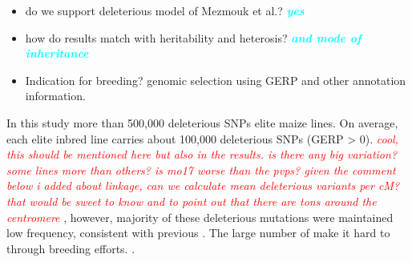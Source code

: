 \documentclass[9pt,twocolumn,twoside]{gsajnl}
\newcommand{\yang}[1]{\textcolor{cyan}{\emph{\bf  #1}} }
\newcommand{\jri}[1]{\textcolor{red}{ \emph{ #1}} }
\begin{document}
\begin{itemize}
  \item do we support deleterious model of Mezmouk et al.? \yang{yes}
  \item how do results match with heritability and heterosis? \yang{and mode of inheritance}
  \item Indication for breeding? genomic selection using GERP and other annotation information. 
\end{itemize}


In this study \DIFdelbegin \DIFdel{, }\DIFdelend \DIFaddbegin {}\DIFaddend more than 500,000 deleterious SNPs \DIFdelbegin {}\DIFdelend \DIFaddbegin {}\DIFaddend elite maize lines.
On average, each elite inbred line carries about 100,000 deleterious SNPs (GERP > 0). \DIFdelbegin {}\DIFdelend \DIFaddbegin \jri{cool, this should be mentioned here but also in the results. is there any big variation?  some lines more than others? is mo17 worse than the pvps? given the comment below i added about linkage, can we calculate mean deleterious variants per cM?  that would be sweet to know and to point out that there are tons around the centromere}
\DIFaddend , however, \DIFaddbegin {}\DIFaddend majority of these deleterious mutations were maintained \DIFdelbegin {}\DIFdelend \DIFaddbegin {}\DIFaddend low frequency, \DIFdelbegin {}\DIFdelend consistent with previous \DIFdelbegin {}\DIFdelend \DIFaddbegin {}\DIFaddend \citep{rodgers2015recombination}. 
The large number of \DIFdelbegin {}\DIFdelend \DIFaddbegin {}\DIFaddend make it hard to \DIFdelbegin {}\DIFdelend \DIFaddbegin {}\DIFaddend through breeding efforts. \DIFdelbegin {}\DIFdelend \DIFaddbegin {}\DIFaddend .
\end{document}
